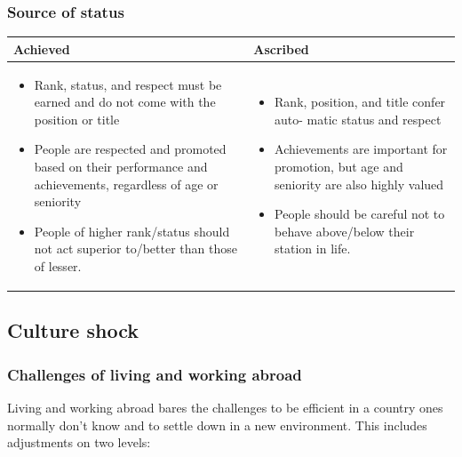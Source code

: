 \subsubsection{Source of status}
\begin{tabularx}{\textwidth}{X|X}
	\textbf{Achieved} & \textbf{Ascribed} \\ 
	\hline 
	\begin{itemize}
		\tightlist
		\item Rank,	status, and respect must be	earned and do not come with the position or title
		\item People are respected and promoted based on their performance
		and achievements, regardless of age or seniority
		\item People of higher rank/status should not act superior to/better than those of lesser.
	\end{itemize}
	&
	\begin{itemize}
		\tightlist
		\item Rank, position, and title confer auto-
		matic status and respect
		\item Achievements are important for promotion, but age and seniority are also highly valued
		\item People should be careful not to behave above/below their station in life.
	\end{itemize} \\
\end{tabularx}

\subsection{Culture shock}

\subsubsection{Challenges of living and working abroad}

Living and working abroad bares the challenges to be efficient in a country ones normally don’t know and to settle down in a new environment. This includes adjustments on two levels:

